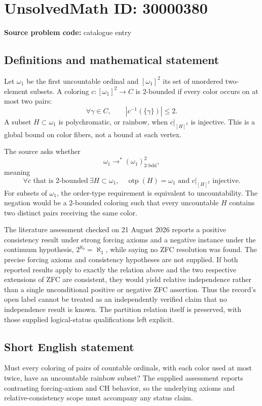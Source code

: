 \documentclass[11pt]{article}
\begin{document}
\section*{UnsolvedMath ID: 30000380}
\textbf{Source problem code:} catalogue entry
\subsection{Definitions and mathematical statement}
Let $\omega_1$ be the first uncountable ordinal and $[\omega_1]^2$ its set of unordered two-element subsets. A coloring $c:[\omega_1]^2\to C$ is $2$-bounded if every color occurs on at most two pairs:
\[
 \forall\gamma\in C,\qquad|c^{-1}(\{\gamma\})|\le2.
\]
A subset $H\subset\omega_1$ is polychromatic, or rainbow, when $c|_{[H]^2}$ is injective. This is a global bound on color fibers, not a bound at each vertex.

The source asks whether
\[
 \omega_1\rightarrow^*(\omega_1)^2_{2\text{-bdd}},
\]
meaning
\[
 \forall c\text{ that is }2\text{-bounded}\ \exists H\subset\omega_1,
 \quad\operatorname{otp}(H)=\omega_1\text{ and }c|_{[H]^2}\text{ injective}.
\]
For subsets of $\omega_1$, the order-type requirement is equivalent to uncountability. The negation would be a $2$-bounded coloring such that every uncountable $H$ contains two distinct pairs receiving the same color.

The literature assessment checked on 21 August 2026 reports a positive consistency result under strong forcing axioms and a negative instance under the continuum hypothesis, $2^{\aleph_0}=\aleph_1$, while saying no ZFC resolution was found. The precise forcing axioms and consistency hypotheses are not supplied. If both reported results apply to exactly the relation above and the two respective extensions of ZFC are consistent, they would yield relative independence rather than a single unconditional positive or negative ZFC assertion. Thus the record's open label cannot be treated as an independently verified claim that no independence result is known. The partition relation itself is preserved, with those supplied logical-status qualifications left explicit.
\subsection{Short English statement}
Must every coloring of pairs of countable ordinals, with each color used at most twice, have an uncountable rainbow subset? The supplied assessment reports contrasting forcing-axiom and CH behavior, so the underlying axioms and relative-consistency scope must accompany any status claim.
\end{document}
